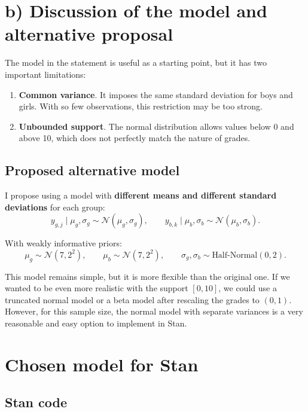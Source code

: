 \documentclass[
  english,
  12pt,
]{article}
\providecommand{\tightlist}{%
  \setlength{\itemsep}{0pt}\setlength{\parskip}{0pt}}
\begin{document}
\section{b) Discussion of the model and alternative
proposal}\label{b-discussion-of-the-model-and-alternative-proposal}

The model in the statement is useful as a starting point, but it has two
important limitations:

\begin{enumerate}
\def\labelenumi{\arabic{enumi}.}
\tightlist
\item
  \textbf{Common variance}. It imposes the same standard deviation for
  boys and girls. With so few observations, this restriction may be too
  strong.
\item
  \textbf{Unbounded support}. The normal distribution allows values
  below 0 and above 10, which does not perfectly match the nature of
  grades.
\end{enumerate}

\subsection{Proposed alternative
model}\label{proposed-alternative-model}

I propose using a model with \textbf{different means and different
standard deviations} for each group: \[
y_{g,j} \mid \mu_g, \sigma_g \sim \mathcal N(\mu_g, \sigma_g),
\qquad
y_{b,k} \mid \mu_b, \sigma_b \sim \mathcal N(\mu_b, \sigma_b).
\]

With weakly informative priors: \[
\mu_g \sim \mathcal N(7, 2^2), \qquad
\mu_b \sim \mathcal N(7, 2^2), \qquad
\sigma_g, \sigma_b \sim \text{Half-Normal}(0, 2).
\]

This model remains simple, but it is more flexible than the original
one. If we wanted to be even more realistic with the support \([0,10]\),
we could use a truncated normal model or a beta model after rescaling
the grades to \((0,1)\). However, for this sample size, the normal model
with separate variances is a very reasonable and easy option to
implement in Stan.

\section{Chosen model for Stan}\label{chosen-model-for-stan}

\subsection{Stan code}\label{stan-code}
\end{document}
